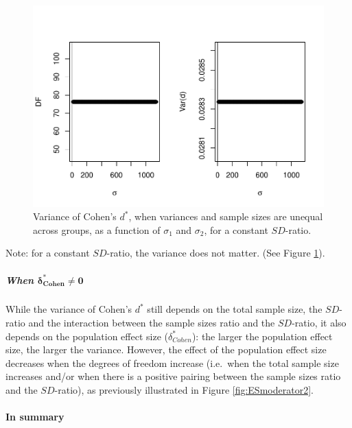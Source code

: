 \documentclass[
  english,
  man,mask]{apa6}
\let\oldparagraph\paragraph
\renewcommand{\paragraph}[1]{\oldparagraph{#1}\mbox{}}
\let\oldsubparagraph\subparagraph
\renewcommand{\subparagraph}[1]{\oldsubparagraph{#1}\mbox{}}
\begin{document}
\begin{figure}
\centering
\includegraphics{Theoretical-Bias-of-all-estimators-as-a-function-of-population-parameters_files/figure-latex/varcohendprimehetunbalvariance2-1.pdf}
\caption{\label{fig:varcohendprimehetunbalvariance2}Variance of Cohen's \(d^*\), when variances and sample sizes are unequal across groups, as a function of \(\sigma_1\) and \(\sigma_2\), for a constant \(SD\)-ratio.}
\end{figure}

Note: for a constant \(SD\)-ratio, the variance does not matter. (See Figure \ref{fig:varcohendprimehetunbalvariance2}).

\hypertarget{when-bmdelta_cohen-neq-0-2}{%
\subparagraph{\texorpdfstring{When \(\bm{\delta^*_{Cohen} \neq 0}\)}{When \textbackslash bm\{\textbackslash delta\^{}*\_\{Cohen\} \textbackslash neq 0\}}}\label{when-bmdelta_cohen-neq-0-2}}

While the variance of Cohen's \(d^*\) still depends on the total sample size, the \(SD\)-ratio and the interaction between the sample sizes ratio and the \(SD\)-ratio, it also depends on the population effect size (\(\delta^*_{Cohen}\)): the larger the population effect size, the larger the variance. However, the effect of the population effect size decreases when the degrees of freedom increase (i.e.~when the total sample size increases and/or when there is a positive pairing between the sample sizes ratio and the \(SD\)-ratio), as previously illustrated in Figure \ref{fig:ESmoderator2}.

\hypertarget{in-summary-3}{%
\paragraph{In summary}\label{in-summary-3}}
\end{document}
